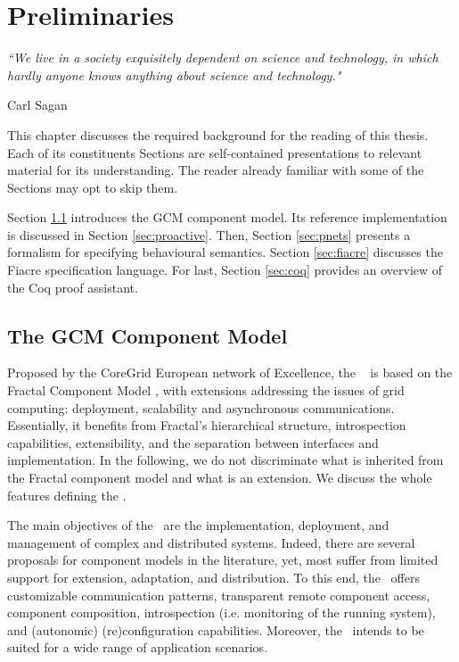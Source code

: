 
\chapter{Preliminaries} 
\label{chap:preli} 


\epigraph{\textit{“We live in a society exquisitely dependent on science and technology, 
                             in which hardly anyone knows anything about science and technology."}}{Carl Sagan}

	This chapter discusses the required background for the reading of this thesis. Each of its constituents
	Sections are self-contained presentations to relevant material for its understanding.
	The reader already familiar with some of the Sections may opt to skip 
	them.
	
	Section \ref{sec:gcm} introduces the GCM component model. Its reference implementation
	is discussed in Section \ref{sec:proactive}. Then, Section \ref{sec:pnets} presents
	a formalism for specifying behavioural semantics. Section \ref{sec:fiacre} discusses
	the Fiacre specification language. For last, Section \ref{sec:coq}
	provides an overview of the Coq proof assistant.


\minitoc



\section{The GCM Component Model}
\label{sec:gcm}

	
	Proposed by the CoreGrid European network of Excellence, the \gcm\ \cite{BCDGHP:Telecom08}
	is based on the Fractal Component Model \cite{fractalSpec}, with extensions addressing the
	issues of grid computing: deployment, scalability and asynchronous communications. Essentially, it benefits from Fractal's
	hierarchical  structure, introspection capabilities, extensibility, and the separation between interfaces and implementation. 
	In the following, we do not discriminate what is inherited from the Fractal 
	component model and what is an extension. We discuss the whole features defining the \gcm.	
	
		The main objectives of the \gcm\ are the implementation, deployment, and management of complex
	and distributed systems. Indeed, there are several proposals for component models in the literature, yet,
	most suffer from limited support for extension, adaptation, and distribution. To this end, the \gcm\
	offers customizable communication patterns, transparent remote component access, component composition,
	introspection (i.e. monitoring of the running system), and (autonomic) (re)configuration capabilities.		
		Moreover, the \gcm\ intends to be suited for a wide range of application scenarios.
		
